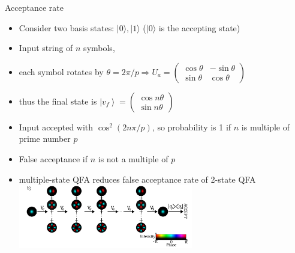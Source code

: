 \documentclass[aspectratio=169,9pt]{beamer}
\begin{document}
\begin{frame}[t]{Acceptance rate}
  \begin{itemize}
    \item Consider two basis states: $|0\rangle,|1\rangle$ ($|0\rangle$ is the accepting state)
    \item Input string of $n$ symbols, 
    \item each symbol rotates by $\theta=2\pi/p \Rightarrow U_{a}=\left(\begin{array}{rr}\cos \theta & -\sin \theta \\ \sin \theta & \cos \theta\end{array}\right)$
    \item thus the final state is $\left|v_{f}\right\rangle=\left(\begin{array}{c}\cos n \theta \\ \sin n \theta\end{array}\right)$
    \item Input accepted with $\cos^2(2n\pi/p)$, so probability is 1 if $n$ is multiple of prime number $p$
    \item False acceptance if $n$ is not a multiple of $p$
    \item multiple-state QFA reduces false acceptance rate of 2-state QFA
    \includegraphics[width=0.6\textwidth]{2dstate.png}
  \end{itemize}
\end{frame}


\end{document}
